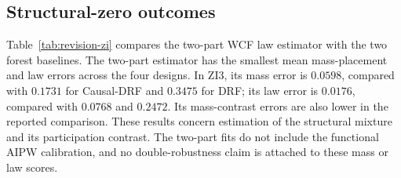 

\subsection{Structural-zero outcomes}

Table~\ref{tab:revision-zi} compares the two-part WCF law estimator with the two forest baselines. The two-part estimator has the smallest mean mass-placement and law errors across the four designs. In ZI3, its mass error is $0.0598$, compared with $0.1731$ for Causal-DRF and $0.3475$ for DRF; its law error is $0.0176$, compared with $0.0768$ and $0.2472$. Its mass-contrast errors are also lower in the reported comparison. These results concern estimation of the structural mixture and its participation contrast. The two-part fits do not include the functional AIPW calibration, and no double-robustness claim is attached to these mass or law scores.


